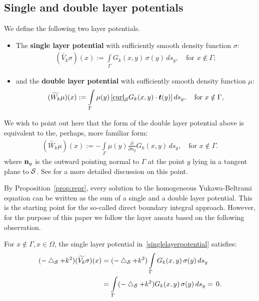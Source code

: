 \subsection{Single and double layer potentials}
We define the following two layer potentials.
\begin{itemize}
\item The {\bf single layer potential} with sufficiently smooth density
function $\sigma$:
  \begin{align}
    (\widetilde{V_k}\sigma)(x):=\int\limits_{\Gamma}
    G_k(x,y)\,\sigma(y)\,ds_y,\quad\mbox{for $x \notin \Gamma$};
    \label{singlelayerpotential}
  \end{align}
\item and the {\bf double layer potential} with sufficiently smooth
density function $\mu$:
  \begin{align}
    (\widetilde{W_k}\mu )(x):=\int\limits_{\Gamma}
    \mu(y)\,[\underline{\mbox{curl}}_{\S} G_k(x,y)\cdot \vec{t}(y)]\,
    ds_y, \quad\mbox{for $x\notin\Gamma$},
    \label{doublelayerpotential}
  \end{align}
\end{itemize}
We wish to point out here that the form of the double layer potential above is equivalent to the, perhaps, more familiar form:
  \begin{align}
    (\widetilde{W_k}\mu )(x):=-\int\limits_{\Gamma}
    \mu(y) \frac{\partial \,}{\partial n_y} G_k(x,y) \,
    ds_y, \quad\mbox{for $x\notin\Gamma$}.
  \end{align}
where ${\bf n}_y$ is the outward pointing normal to $\Gamma$ at the point $y$ lying in a tangent plane to $\S$. See \cite{kro:nig2013} for a more detailed discussion on this point.

By Proposition~\ref{prop:repr}, every solution to the homogeneous
Yukawa-Beltrami equation can be written as the sum of a single and a
double layer potential.  This  is the starting point for the so-called
direct boundary integral approach. However, for the purpose of this
paper we follow the layer ansatz based on the following observation.

For $x\notin\Gamma, x\in \Omega$, the single layer potential
in~\eqref{singlelayerpotential} satisfies:
\begin{align*}
  (-\lap_{\S} + k^{2}) (\widetilde{V_k}\sigma)(x)& =
  (-\lap_{\S} + k^2) \int\limits_\Gamma G_k(x,y)\, \sigma(y)\,ds_{y} \\
  & = \int\limits_\Gamma (-\lap_{\S}+k^2) G_k(x,y)\, 
    \sigma(y)\,ds_{y}= \, 0.
\end{align*}

